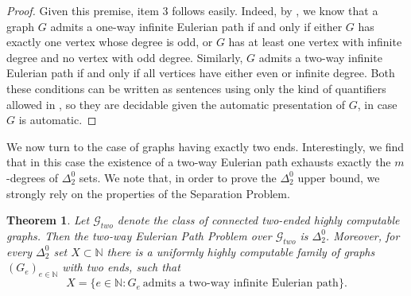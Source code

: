 \documentclass[10pt,A4]{amsart}
\newtheorem{thm}{Theorem}[section]
\theoremstyle{definition}
\theoremstyle{definition}
\newcommand{\N}{\mathbb{N}}
\renewcommand{\mid}{ : }
\begin{document}
\begin{proof}
Given this premise, item 3 follows easily. 
Indeed, by , we know that a graph $G$ admits a one-way infinite Eulerian path if and only if either $G$ has exactly one vertex whose degree is odd, or $G$ has at least one vertex with infinite degree and no vertex with odd degree. Similarly, $G$ admits a two-way infinite Eulerian path if and only if all vertices have either even or infinite degree. Both these conditions can be written as sentences using only the kind of quantifiers allowed in , so they are decidable given the automatic presentation of $G$, in case $G$ is automatic. 
\end{proof}
We now turn to the case of graphs having exactly two ends. Interestingly, we find that in this case the existence of a two-way Eulerian path exhausts exactly the $m$-degrees of $\Delta_2^0$ sets. We note that, in order to prove the $\Delta_2^0$ upper bound, we strongly rely on the properties of the Separation Problem. 
\begin{thm} \label{thm:hardness-e_2-2fin} Let $\mathcal{G}_{two}$
denote the class of connected two-ended  highly computable graphs. Then the two-way Eulerian Path Problem over $\mathcal{G}_{two}$ is $\Delta_2^0$. Moreover, for every $\Delta_2^0$ set $X\subset \N$ there is a uniformly highly computable family of graphs $(G_e)_{e\in\N}$ with two ends, such that 
    $$X=\{e\in \N \mid G_e \ \text{admits a two-way infinite Eulerian path}\}.$$ 
\end{thm}
\end{document}
